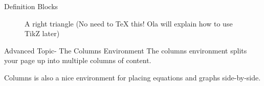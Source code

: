 \documentclass{beamer}
\begin{document}
	
	\begin{frame}{Definition Blocks}
	  

		\begin{figure}[hb]
			\caption{A right triangle (No need to TeX this! Ola will explain how to use TikZ later)}
		\end{figure}
	\end{frame}
	

	
	
	
	\begin{frame}{Advanced Topic- The Columns Environment}
		The columns environment splits your page up into multiple columns of content.
                
                \vspace{0.3in}


                \vspace{0.3in}
			
		Columns is also a nice environment for placing equations and graphs side-by-side.		
	\end{frame}
	
\end{document}
